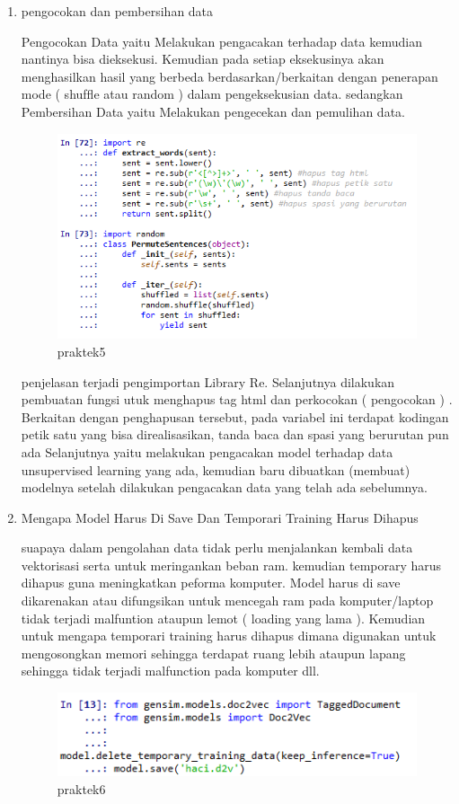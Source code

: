 \begin{enumerate}
			\item pengocokan dan pembersihan data
			\par Pengocokan Data yaitu Melakukan pengacakan terhadap data kemudian nantinya bisa dieksekusi. Kemudian pada setiap eksekusinya akan menghasilkan hasil yang berbeda berdasarkan/berkaitan dengan penerapan mode ( shufﬂe atau random ) dalam pengeksekusian data. sedangkan Pembersihan Data yaitu Melakukan pengecekan dan pemulihan data.
	  			\begin{figure}[H]
					\centering
					\includegraphics[scale=0.4]{figures/1174057/chapter5/5_P.PNG}
					\caption{praktek5}
					\label{praktek5}
				\end{figure}
			\par penjelasan terjadi pengimportan Library Re. Selanjutnya dilakukan pembuatan fungsi utuk menghapus tag html dan perkocokan ( pengocokan ) . Berkaitan dengan penghapusan tersebut, pada variabel ini terdapat kodingan petik satu yang bisa direalisasikan, tanda baca dan spasi yang berurutan pun ada Selanjutnya yaitu melakukan pengacakan model terhadap data unsupervised learning yang ada, kemudian baru dibuatkan (membuat) modelnya setelah dilakukan pengacakan data yang telah ada sebelumnya.

			\item Mengapa Model Harus Di Save Dan Temporari Training Harus Dihapus
			\par suapaya dalam pengolahan data tidak perlu menjalankan kembali data vektorisasi serta untuk meringankan beban ram. kemudian temporary harus dihapus guna meningkatkan peforma komputer. Model harus di save dikarenakan atau difungsikan untuk mencegah ram pada komputer/laptop tidak terjadi malfuntion ataupun lemot ( loading yang lama ). Kemudian untuk mengapa temporari training harus dihapus dimana digunakan untuk mengosongkan memori sehingga terdapat ruang lebih ataupun lapang sehingga tidak terjadi malfunction pada komputer dll. 
	  			\begin{figure}[H]
					\centering
					\includegraphics[scale=0.4]{figures/1174057/chapter5/6_1.png}
					\caption{praktek6}
					\label{praktek6}
				\end{figure}


\end{enumerate}
